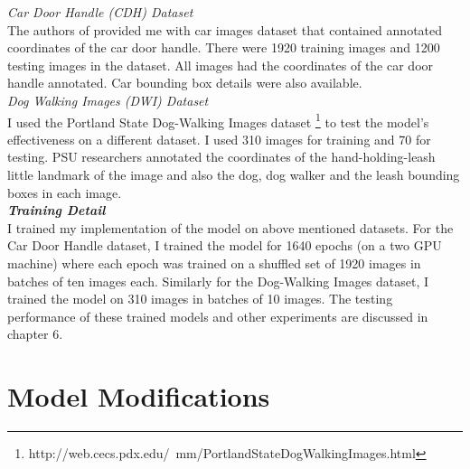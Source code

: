 \documentclass [11pt,letterpaper ,twoside ,openany ]{report}
\begin{document}
    \noindent
    \textit{Car Door Handle (CDH) Dataset}\\
    The authors of \cite{Singh_2016_CVPR} provided me with car images dataset that contained annotated coordinates of the car door handle. There were 1920 training images and 1200 testing images in the dataset. All images had the coordinates of the car door handle annotated. Car bounding box details were also available.\\

    \noindent
    \textit{Dog Walking Images (DWI) Dataset}\\
    I used the Portland State Dog-Walking Images dataset \footnote {http://web.cecs.pdx.edu/~mm/PortlandStateDogWalkingImages.html} to test the model's effectiveness on a different dataset. I used 310 images for training and 70 for testing. PSU researchers annotated the coordinates of the hand-holding-leash little landmark of the image and also the dog, dog walker and the leash bounding boxes in each image.\\

    \noindent
    \textbf{\textit{Training Detail}}\\
    I trained my implementation of the model on above mentioned datasets. For the Car Door Handle dataset, I trained the model for 1640 epochs (on a two GPU machine) where each epoch was trained on a shuffled set of 1920 images in batches of ten images each. Similarly for the Dog-Walking Images dataset, I trained the model on 310 images in batches of 10 images. The testing performance of these trained models and other experiments are discussed in chapter 6.

    \section{Model Modifications}
\end{document}
